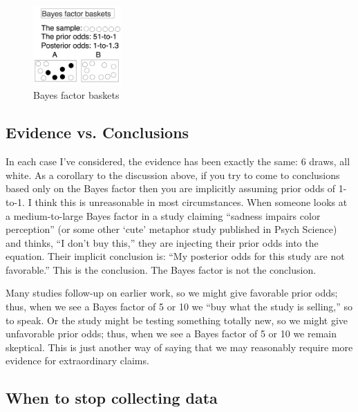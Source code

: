 \begin{figure}[h]
\centering
\includegraphics[width=0.3\textwidth]{pic/p05c03-snip22.png}
\caption{Bayes factor baskets}
\label{fig:p05c03-snip22}
\end{figure}


\subsection{Evidence vs. Conclusions}

In each case I've considered, the evidence has been exactly the same: 6 draws, all white. As a corollary to the discussion above, if you try to come to conclusions based only on the Bayes factor then you are implicitly assuming prior odds of 1-to-1. I think this is unreasonable in most circumstances. When someone looks at a medium-to-large Bayes factor in a study claiming ``sadness impairs color perception'' (or some other ‘cute' metaphor study published in Psych Science) and thinks, ``I don't buy this,'' they are injecting their prior odds into the equation. Their implicit conclusion is: ``My posterior odds for this study are not favorable.'' This is the conclusion. The Bayes factor is not the conclusion.

Many studies follow-up on earlier work, so we might give favorable prior odds; thus, when we see a Bayes factor of 5 or 10 we ``buy what the study is selling,'' so to speak. Or the study might be testing something totally new, so we might give unfavorable prior odds; thus, when we see a Bayes factor of 5 or 10 we remain skeptical. This is just another way of saying that we may reasonably require more evidence for extraordinary claims.

\subsection{When to stop collecting data}

